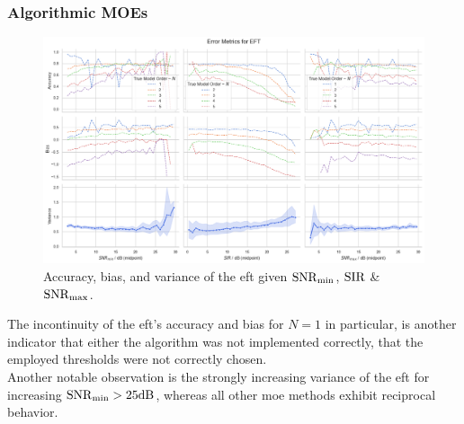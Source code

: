 \subsubsection{Algorithmic MOEs}
\begin{figure}[H]
    \centering
    \includegraphics[width=\textwidth]{figures/07_Evaluation/snr_sir/eft_3x3.png}
    \caption{Accuracy, bias, and variance of the \gls{eft} given \( \mathrm{SNR}_{\min} \), \( \mathrm{SIR} \) \& \( \mathrm{SNR}_{\max} \).}
    \label{fig:eval_grids/eft}
\end{figure}
The incontinuity of the \gls{eft}'s accuracy and bias for \( N = 1 \) in particular, is another indicator that either the algorithm
was not implemented correctly, that the employed thresholds were not correctly chosen. \\
Another notable observation is the strongly increasing variance of the \gls{eft} for increasing \( \SNRmin > 25 \si{\decibel} \), whereas
all other \gls{moe} methods exhibit reciprocal behavior. \\


